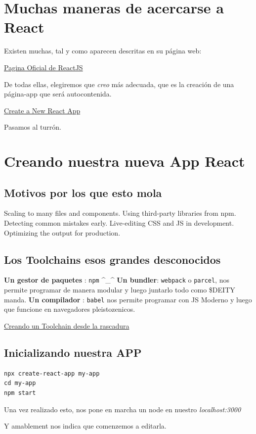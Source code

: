 \documentclass[11pt]{article}
\begin{document}
\section{Muchas maneras de acercarse a React}
\label{sec:orgc47f906}

Existen muchas, tal y como aparecen descritas en su página web:

\href{https://reactjs.org/}{Pagina Oficial de ReactJS}

De todas ellas, elegiremos que \emph{creo} más adecuada, que es la creación de una
página-app que será autocontenida.

\href{https://reactjs.org/docs/create-a-new-react-app.html}{Create a New React App}

Pasamos al turrón.

\section{Creando nuestra nueva App React}
\label{sec:org0fcb6d0}

\subsection{Motivos por los que esto mola}
\label{sec:org9c386a0}

Scaling to many files and components.
Using third-party libraries from npm.
Detecting common mistakes early.
Live-editing CSS and JS in development.
Optimizing the output for production.







\subsection{Los Toolchains esos grandes desconocidos}
\label{sec:org1375f3a}

\textbf{Un gestor de paquetes} : \texttt{npm} \^{}\_\^{}
\textbf{Un bundler}: \texttt{webpack} o \texttt{parcel}, nos permite programar de manera modular y
luego juntarlo todo como \$DEITY manda.
\textbf{Un compilador} : \texttt{babel} nos permite programar con JS Moderno y luego que
funcione en navegadores pleistozenicos.

\href{https://reactjs.org/docs/create-a-new-react-app.html\#creating-a-toolchain-from-scratch}{Creando un Toolchain desde la rascadura}


\subsection{Inicializando nuestra APP}
\label{sec:orgda8b651}

\begin{verbatim}
npx create-react-app my-app
cd my-app
npm start
\end{verbatim}

Una vez realizado esto, nos pone en marcha un node en nuestro
\emph{localhost:3000}

Y amablement nos indica que comenzemos a editarla.
\end{document}
